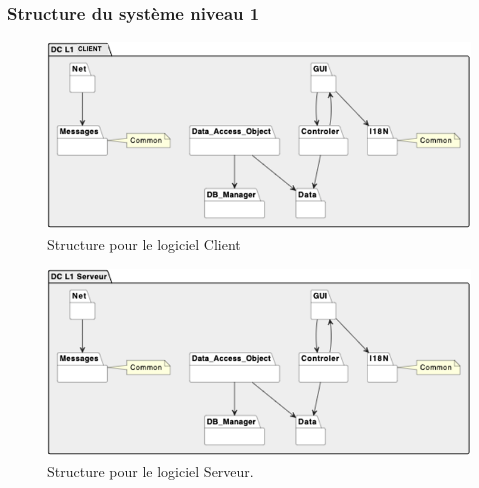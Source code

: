 \subsubsection{Structure du système niveau 1}
\begin{figure}[H]
	\centering
	\includegraphics[height=5cm]{img/DC_L1Client.png} 
	\caption{Structure pour le logiciel Client}
\end{figure}

\begin{figure}[H]
	\centering
	\includegraphics[height=5cm]{img/DC_L1Serveur.png} 
	\caption{Structure pour le logiciel Serveur.}
\end{figure}


